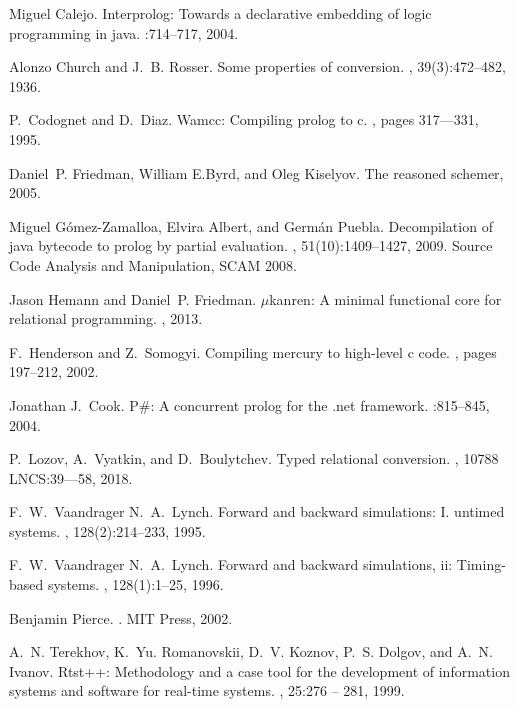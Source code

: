 \begin{thebibliography}{10}
Miguel Calejo.
\newblock Interprolog: Towards a declarative embedding of logic programming in
  java.
:714--717, 2004.

Alonzo Church and J.~B. Rosser.
\newblock Some properties of conversion.
,
  39(3):472--482, 1936.

P.~Codognet and D.~Diaz.
\newblock Wamcc: Compiling prolog to c.
, pages 317--–331, 1995.

Daniel~P. Friedman, William E.Byrd, and Oleg Kiselyov.
\newblock The reasoned schemer, 2005.

Miguel Gómez-Zamalloa, Elvira Albert, and Germán Puebla.
\newblock Decompilation of java bytecode to prolog by partial evaluation.
, 51(10):1409--1427, 2009.
\newblock Source Code Analysis and Manipulation, SCAM 2008.

Jason Hemann and Daniel~P. Friedman.
\newblock $\mu$kanren: A minimal functional core for relational programming.
, 2013.

F.~Henderson and Z.~Somogyi.
\newblock Compiling mercury to high-level c code.
, pages 197--212, 2002.

Jonathan J.~Cook.
\newblock P\#: A concurrent prolog for the .net framework.
:815--845, 2004.

P.~Lozov, A.~Vyatkin, and D.~Boulytchev.
\newblock Typed relational conversion.
, 10788 LNCS:39---58, 2018.

F.~W.~Vaandrager N.~A.~Lynch.
\newblock Forward and backward simulations: I. untimed systems.
, 128(2):214--233, 1995.

F.~W.~Vaandrager N.~A.~Lynch.
\newblock Forward and backward simulations, ii: Timing-based systems.
, 128(1):1--25, 1996.

Benjamin Pierce.
.
\newblock MIT Press, 2002.

A.~N. Terekhov, K.~Yu. Romanovskii, D.~V. Koznov, P.~S. Dolgov, and A.~N.
  Ivanov.
\newblock Rtst++: Methodology and a case tool for the development of
  information systems and software for real-time systems.
, 25:276 -- 281, 1999.


\end{thebibliography}
